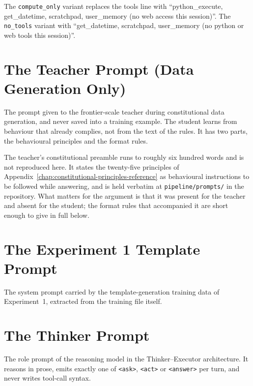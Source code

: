 

The \texttt{compute\_only} variant replaces the tools line with ``python\_execute, get\_datetime, scratchpad, user\_memory (no web access this session)''. The \texttt{no\_tools} variant with ``get\_datetime, scratchpad, user\_memory (no python or web tools this session)''.

\section*{The Teacher Prompt (Data Generation Only)}
The prompt given to the frontier-scale teacher during constitutional data generation, and never saved into a training example. The student learns from behaviour that already complies, not from the text of the rules. It has two parts, the behavioural principles and the format rules.

The teacher's constitutional preamble runs to roughly six hundred words and is not reproduced here. It states the twenty-five principles of Appendix~\ref{chap:constitutional-principles-reference} as behavioural instructions to be followed while answering, and is held verbatim at \texttt{pipeline/prompts/} in the repository. What matters for the argument is that it was present for the teacher and absent for the student; the format rules that accompanied it are short enough to give in full below.



\section*{The Experiment 1 Template Prompt}
The system prompt carried by the template-generation training data of Experiment~1, extracted from the training file itself.



\section*{The Thinker Prompt}
The role prompt of the reasoning model in the Thinker--Executor architecture. It reasons in prose, emits exactly one of \texttt{<ask>}, \texttt{<act>} or \texttt{<answer>} per turn, and never writes tool-call syntax.



